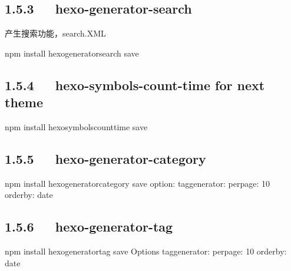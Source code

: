 \documentclass[letterpaper,12pt,english]{sphinxmanual}
\begin{document}
\subsection{1.5.3   hexo-generator-search}
\label{\detokenize{001software/001install/001._u7f51_u7ad9/hexo:hexo-generator-search}}
产生搜索功能，search.XML

\begin{sphinxVerbatim}[commandchars=\\\{\}]
\PYGZdl{} npm install hexo\PYGZhy{}generator\PYGZhy{}search \PYGZhy{}\PYGZhy{}save
\end{sphinxVerbatim}


\subsection{1.5.4   hexo-symbols-count-time for next theme}
\label{\detokenize{001software/001install/001._u7f51_u7ad9/hexo:hexo-symbols-count-time-for-next-theme}}
\begin{sphinxVerbatim}[commandchars=\\\{\}]
\PYGZdl{} npm install hexo\PYGZhy{}symbols\PYGZhy{}count\PYGZhy{}time \PYGZhy{}\PYGZhy{}save
\end{sphinxVerbatim}


\subsection{1.5.5   hexo-generator-category}
\label{\detokenize{001software/001install/001._u7f51_u7ad9/hexo:hexo-generator-category}}
\begin{sphinxVerbatim}[commandchars=\\\{\}]
\PYGZdl{} npm install hexo\PYGZhy{}generator\PYGZhy{}category \PYGZhy{}\PYGZhy{}save
option:
tag\PYGZus{}generator:
  per\PYGZus{}page: 10
  order\PYGZus{}by: \PYGZhy{}date
\end{sphinxVerbatim}


\subsection{1.5.6   hexo-generator-tag}
\label{\detokenize{001software/001install/001._u7f51_u7ad9/hexo:hexo-generator-tag}}
\begin{sphinxVerbatim}[commandchars=\\\{\}]
\PYGZdl{} npm install hexo\PYGZhy{}generator\PYGZhy{}tag \PYGZhy{}\PYGZhy{}save
Options
tag\PYGZus{}generator:
  per\PYGZus{}page: 10
  order\PYGZus{}by: \PYGZhy{}date
\end{sphinxVerbatim}
\end{document}
